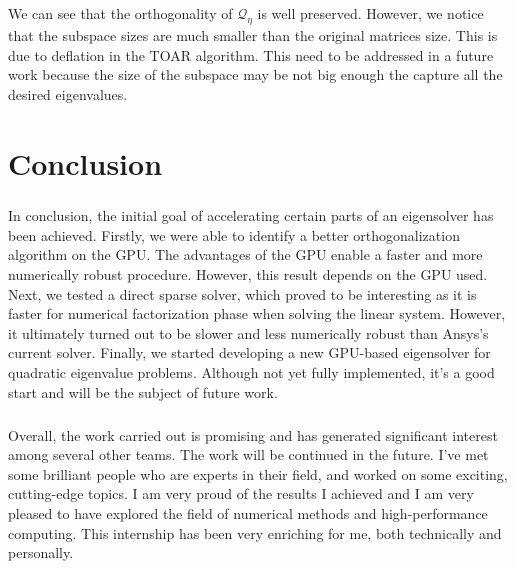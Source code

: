 \paragraph*{}
We can see that the orthogonality of $\mathcal{Q}_{\eta}$ is well preserved. However, we notice that the subspace sizes are much smaller than the original matrices size. This is due to deflation in the TOAR algorithm. This need to be addressed in a future work because the size of the subspace may be not big enough the capture all the desired eigenvalues.

\chapter{Conclusion}
\paragraph*{}
In conclusion, the initial goal of accelerating certain parts of an eigensolver has been achieved. Firstly, we were able to identify a better orthogonalization algorithm on the GPU. The advantages of the GPU enable a faster and more numerically robust procedure. However, this result depends on the GPU used. Next, we tested a direct sparse solver, which proved to be interesting as it is faster for numerical factorization phase when solving the linear system. However, it ultimately turned out to be slower and less numerically robust than Ansys's current solver. Finally, we started developing a new GPU-based eigensolver for quadratic eigenvalue problems. Although not yet fully implemented, it's a good start and will be the subject of future work.

\paragraph*{}
Overall, the work carried out is promising and has generated significant interest among several other teams. The work will be continued in the future. I've met some brilliant people who are experts in their field, and worked on some exciting, cutting-edge topics. I am very proud of the results I achieved and I am very pleased to have explored the field of numerical methods and high-performance computing. This internship has been very enriching for me, both technically and personally.










